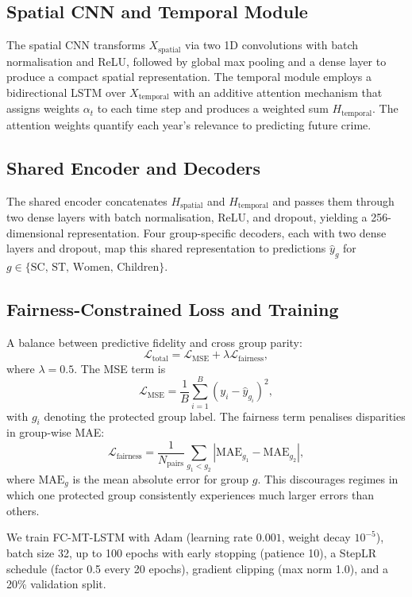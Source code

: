 \documentclass{svproc}
\newcommand{\modelname}{FC-MT-LSTM}
\begin{document}
\subsection{Spatial CNN and Temporal Module}

The spatial CNN transforms $X_{\text{spatial}}$ via two 1D convolutions with batch normalisation and ReLU, followed by global max pooling and a dense layer to produce a compact spatial representation. The temporal module employs a bidirectional LSTM over $X_{\text{temporal}}$ with an additive attention mechanism that assigns weights $\alpha_t$ to each time step and produces a weighted sum $H_{\text{temporal}}$. The attention weights quantify each year's relevance to predicting future crime.

\subsection{Shared Encoder and Decoders}

The shared encoder concatenates $H_{\text{spatial}}$ and $H_{\text{temporal}}$ and passes them through two dense layers with batch normalisation, ReLU, and dropout, yielding a 256-dimensional representation. Four group-specific decoders, each with two dense layers and dropout, map this shared representation to predictions $\hat{y}_g$ for $g \in \{\text{SC, ST, Women, Children}\}$.

\subsection{Fairness-Constrained Loss and Training}

A balance between predictive fidelity and cross group parity:
\[
\mathcal{L}_{\text{total}} = \mathcal{L}_{\text{MSE}} + \lambda \mathcal{L}_{\text{fairness}},
\]
where $\lambda = 0.5$. The MSE term is
\[
\mathcal{L}_{\text{MSE}} = \frac{1}{B} \sum_{i=1}^{B} (y_i - \hat{y}_{g_i})^2,
\]
with $g_i$ denoting the protected group label. The fairness term penalises disparities in group-wise MAE:
\[
\mathcal{L}_{\text{fairness}} = \frac{1}{N_{\text{pairs}}} \sum_{g_1 < g_2} |\text{MAE}_{g_1} - \text{MAE}_{g_2}|,
\]
where $\text{MAE}_g$ is the mean absolute error for group $g$. This discourages regimes in which one protected group consistently experiences much larger errors than others.

We train \modelname{} with Adam (learning rate $0.001$, weight decay $10^{-5}$), batch size 32, up to 100 epochs with early stopping (patience 10), a StepLR schedule (factor 0.5 every 20 epochs), gradient clipping (max norm 1.0), and a 20\% validation split.
\end{document}
